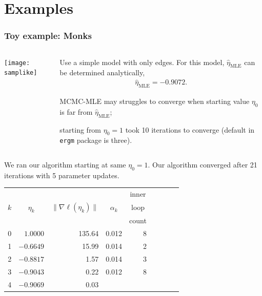 \documentclass[slidestop,compress, 10pt]{beamer}
\newcommand{\etaMLE}{\hat{\eta}_{\textrm{MLE}}}
\begin{document}
\section{Examples}
\frame
{
  \frametitle{Toy example: Monks}  
\begin{columns}[t]
\begin{column}[T]{0.3\textwidth}
\texttt{[image: samplike]}
\end{column}

\begin{column}[r]{0.7\textwidth}
Use a simple model with only edges.  For this model, $\etaMLE$ can be 
determined analytically,
\begin{align*}
	\etaMLE = -0.9072.
\end{align*}

MCMC-MLE may struggles to converge when
starting value $\eta_0$ is far from $\etaMLE$;

starting from $\eta_0 = 1$ took
10 iterations to converge (default in \texttt{ergm} package is three).
\end{column}
\end{columns}

We ran our algorithm starting at same $\eta_0=1$.  Our algorithm converged
after 21 iterations with 5 parameter updates.
{\footnotesize
\begin{table}
\begin{center}
\begin{tabular}{rrrrrrlrr}
  \hline
    &  &  &  & \multicolumn{1}{c}{inner}\\
  \multicolumn{1}{c}{$k$} & 
  \multicolumn{1}{c}{$\eta_k$} &
  \multicolumn{1}{c}{$\lVert \nabla \ell(\eta_k) \rVert$} &
  \multicolumn{1}{c}{$\alpha_k$} &
  \multicolumn{1}{c}{loop }\\
    &  &  &  & \multicolumn{1}{c}{count}\\
  \hline
   0 &  $1.0000$ & 135.64 &  0.012 & 8\\
   1 & $-0.6649$ & 15.99  &  0.014 & 2 \\
   2 & $-0.8817$ & 1.57   &  0.014 & 3 \\
   3 & $-0.9043$ & 0.22   &  0.012 & 8 \\
   4 & $-0.9069$ & 0.03   &  &  \\
   \hline
\end{tabular} \label{T:Sampson redo}
\end{center}
\end{table}}
}
\end{document}

